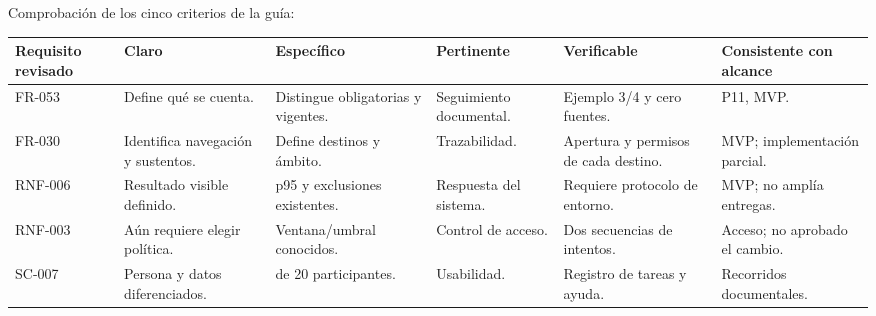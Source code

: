 \documentclass[12pt,a4paper]{report}
\begin{document}
Comprobación de los cinco criterios de la guía:

{\def\LTcaptype{none} %
\begin{longtable}[]{@{}
  >{\raggedright\arraybackslash}p{}
  >{\raggedright\arraybackslash}p{}
  >{\raggedright\arraybackslash}p{}
  >{\raggedright\arraybackslash}p{}
  >{\raggedright\arraybackslash}p{}
  >{\raggedright\arraybackslash}p{}@{}}
\toprule\noalign{}
\begin{minipage}[b]{\linewidth}\raggedright
Requisito revisado
\end{minipage} & \begin{minipage}[b]{\linewidth}\raggedright
Claro
\end{minipage} & \begin{minipage}[b]{\linewidth}\raggedright
Específico
\end{minipage} & \begin{minipage}[b]{\linewidth}\raggedright
Pertinente
\end{minipage} & \begin{minipage}[b]{\linewidth}\raggedright
Verificable
\end{minipage} & \begin{minipage}[b]{\linewidth}\raggedright
Consistente con alcance
\end{minipage} \\
\midrule\noalign{}
\endhead
\bottomrule\noalign{}
\endlastfoot
FR-053 & Define qué se cuenta. & Distingue obligatorias y vigentes. &
Seguimiento documental. & Ejemplo 3/4 y cero fuentes. & P11, MVP. \\
FR-030 & Identifica navegación y sustentos. & Define destinos y ámbito.
& Trazabilidad. & Apertura y permisos de cada destino. & MVP;
implementación parcial. \\
RNF-006 & Resultado visible definido. & p95 y exclusiones existentes. &
Respuesta del sistema. & Requiere protocolo de entorno. & MVP; no amplía
entregas. \\
RNF-003 & Aún requiere elegir política. & Ventana/umbral conocidos. &
Control de acceso. & Dos secuencias de intentos. & Acceso; no aprobado
el cambio. \\
SC-007 & Persona y datos diferenciados. & 19 de 20 participantes. &
Usabilidad. & Registro de tareas y ayuda. & Recorridos documentales. \\
\end{longtable}
}
\end{document}
